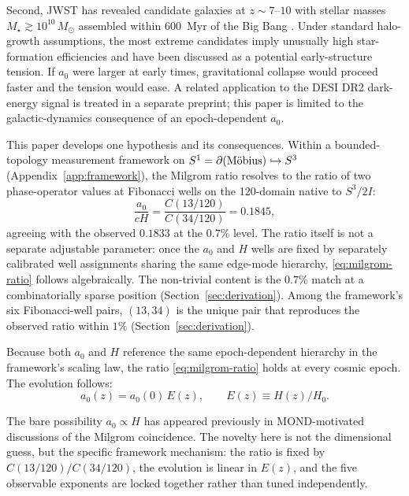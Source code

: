 \documentclass[11pt,a4paper]{article}
\numberwithin{equation}{section}
\numberwithin{table}{section}
\numberwithin{figure}{section}
\newcommand{\Mob}{\ifmmode\text{M\"obius}\else M\"obius\fi}
\newcommand{\afid}{a_0}
\newcommand{\Msun}{M_\odot}
\newcommand{\Hz}{H(z)}
\newcommand{\Ez}{E(z)}
\newcommand{\Cval}[1]{C(#1/120)}
\begin{document}
Second, JWST has revealed candidate galaxies at $z \sim 7$--$10$ with
stellar masses $M_\star \gtrsim 10^{10}\,\Msun$ assembled within
600~Myr of the Big Bang \citep{Labbe2023,BoylanKolchin2023}. Under
standard halo-growth assumptions, the most extreme candidates imply
unusually high star-formation efficiencies and have been discussed as a
potential early-structure tension. If $\afid$ were larger at early
times, gravitational collapse would proceed faster and the tension
would ease. A related application to the DESI DR2 dark-energy signal
\citep{DESI2025} is treated in a separate preprint; this paper is
limited to the galactic-dynamics consequence of an epoch-dependent
$\afid$.

This paper develops one hypothesis and its consequences. Within a
bounded-topology measurement framework on
$S^1 = \partial(\Mob) \hookrightarrow S^3$
(Appendix~\ref{app:framework}), the Milgrom ratio resolves to the ratio
of two phase-operator values at Fibonacci wells on the 120-domain
native to $S^3/2I$:
\begin{equation}
\frac{\afid}{cH} = \frac{\Cval{13}}{\Cval{34}} = 0.1845,
\label{eq:milgrom-ratio}
\end{equation}
agreeing with the observed $0.1833$ at the $0.7\%$ level. The ratio
itself is not a separate adjustable parameter: once the $\afid$ and $H$
wells are fixed by separately calibrated well assignments sharing the
same edge-mode hierarchy, \eqref{eq:milgrom-ratio} follows
algebraically. The non-trivial content is the $0.7\%$ match at a
combinatorially sparse position (Section~\ref{sec:derivation}). Among
the framework's six Fibonacci-well pairs, $(13, 34)$ is the unique pair
that reproduces the observed ratio within $1\%$
(Section~\ref{sec:derivation}).

Because both $\afid$ and $H$ reference the same epoch-dependent
hierarchy in the framework's scaling law, the ratio
\eqref{eq:milgrom-ratio} holds at every cosmic epoch. The evolution
follows:
\begin{equation}
\afid(z) = \afid(0)\,\Ez, \qquad \Ez \equiv \Hz/H_0.
\label{eq:evolution}
\end{equation}

The bare possibility $\afid \propto H$ has appeared previously in
MOND-motivated discussions of the Milgrom coincidence. The novelty here
is not the dimensional guess, but the specific framework mechanism: the
ratio is fixed by $\Cval{13}/\Cval{34}$, the evolution is linear in
$\Ez$, and the five observable exponents are locked together rather
than tuned independently.
\end{document}
